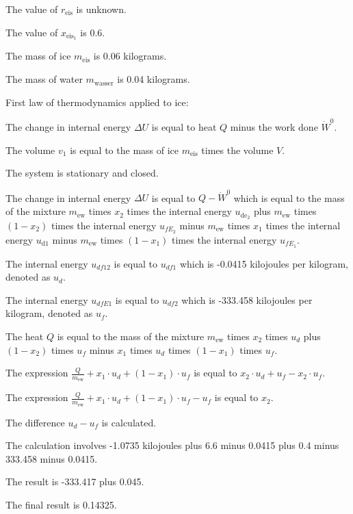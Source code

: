 The value of \( r_{\text{eis}} \) is unknown.

The value of \( x_{\text{eis}_1} \) is 0.6.

The mass of ice \( m_{\text{eis}} \) is 0.06 kilograms.

The mass of water \( m_{\text{wasser}} \) is 0.04 kilograms.

First law of thermodynamics applied to ice:

The change in internal energy \( \Delta U \) is equal to heat \( Q \) minus the work done \( \dot{W}^0 \).

The volume \( v_1 \) is equal to the mass of ice \( m_{\text{eis}} \) times the volume \( V \).

The system is stationary and closed.

The change in internal energy \( \Delta U \) is equal to \( Q - \dot{W}^0 \) which is equal to the mass of the mixture \( m_{\text{ew}} \) times \( x_2 \) times the internal energy \( u_{\text{de}_2} \) plus \( m_{\text{ew}} \) times \( (1 - x_2) \) times the internal energy \( u_{fE_2} \) minus \( m_{\text{ew}} \) times \( x_1 \) times the internal energy \( u_{\text{d}1} \) minus \( m_{\text{ew}} \) times \( (1 - x_1) \) times the internal energy \( u_{fE_1} \).

The internal energy \( u_{df12} \) is equal to \( u_{df1} \) which is -0.0415 kilojoules per kilogram, denoted as \( u_d \).

The internal energy \( u_{dfE1} \) is equal to \( u_{df2} \) which is -333.458 kilojoules per kilogram, denoted as \( u_f \).

The heat \( Q \) is equal to the mass of the mixture \( m_{\text{ew}} \) times \( x_2 \) times \( u_d \) plus \( (1 - x_2) \) times \( u_f \) minus \( x_1 \) times \( u_d \) times \( (1 - x_1) \) times \( u_f \).

The expression \( \frac{Q}{m_{\text{ew}}} + x_1 \cdot u_d + (1 - x_1) \cdot u_f \) is equal to \( x_2 \cdot u_d + u_f - x_2 \cdot u_f \).

The expression \( \frac{Q}{m_{\text{ew}}} + x_1 \cdot u_d + (1 - x_1) \cdot u_f - u_f \) is equal to \( x_2 \).

The difference \( u_d - u_f \) is calculated.

The calculation involves -1.0735 kilojoules plus 6.6 minus 0.0415 plus 0.4 minus 333.458 minus 0.0415.

The result is -333.417 plus 0.045.

The final result is 0.14325.
